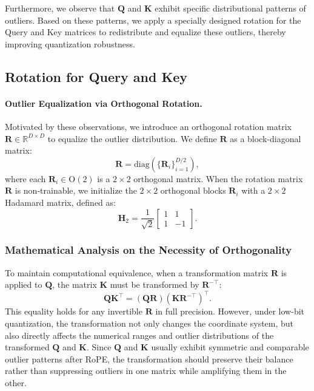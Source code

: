 Furthermore, we observe that $\mathbf{Q}$ and $\mathbf{K}$ exhibit specific distributional patterns of outliers. Based on these patterns, we apply a specially designed rotation for the Query and Key matrices to redistribute and equalize these outliers, thereby improving quantization robustness.

\subsection{Rotation for Query and Key}

\paragraph{\textbf{Outlier Equalization via Orthogonal Rotation.}} 
Motivated by these observations, we introduce an orthogonal rotation matrix $\mathbf{R} \in \mathbb{R}^{D \times D}$ to equalize the outlier distribution. We define $\mathbf{R}$ as a block-diagonal matrix:
\begin{equation}
    \mathbf{R} = \mathrm{diag}\left( \{\mathbf{R}_i\}_{i=1}^{D/2} \right),
\end{equation}
where each $\mathbf{R}_i \in \mathrm{O}(2)$ is a $2 \times 2$ orthogonal matrix. When the rotation matrix $\mathbf{R}$ is non-trainable, we initialize the $2 \times 2$ orthogonal blocks $\mathbf{R}_i$ with a $2 \times 2$ Hadamard matrix, defined as:
\begin{equation}
\label{eq:H_2}
\mathbf{H}_{2} = \frac{1}{\sqrt{2}}
\begin{bmatrix}
 1 &  1 \\
 1 & -1
\end{bmatrix}.
\end{equation}



\subsubsection{Mathematical Analysis on the Necessity of Orthogonality}
\label{sssec:orthogonal_property}

To maintain computational equivalence, when a transformation matrix $\mathbf{R}$ is applied to $\mathbf{Q}$, the matrix $\mathbf{K}$ must be transformed by $\mathbf{R}^{-\top}$:
\begin{equation}
    \mathbf{Q}\mathbf{K}^{\top}
    =
    (\mathbf{Q}\mathbf{R})(\mathbf{K}\mathbf{R}^{-\top})^{\top}.
\end{equation}
This equality holds for any invertible $\mathbf{R}$ in full precision. However, under low-bit quantization, the transformation not only changes the coordinate system, but also directly affects the numerical ranges and outlier distributions of the transformed $\mathbf{Q}$ and $\mathbf{K}$. Since $\mathbf{Q}$ and $\mathbf{K}$ usually exhibit symmetric and comparable outlier patterns after RoPE, the transformation should preserve their balance rather than suppressing outliers in one matrix while amplifying them in the other.

